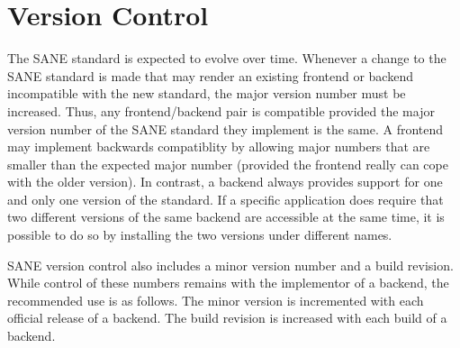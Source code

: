 \documentclass[11pt,DVIps]{report}
\begin{document}
\section{Version Control}

The SANE standard is expected to evolve over time.  Whenever a change
to the SANE standard is made that may render an existing frontend or
backend incompatible with the new standard, the major version number
must be increased.  Thus, any frontend/backend pair is compatible
provided the major version number of the SANE standard they implement
is the same.  A frontend may implement backwards compatiblity by
allowing major numbers that are smaller than the expected major number
(provided the frontend really can cope with the older version).  In
contrast, a backend always provides support for one and only one
version of the standard.  If a specific application does require that
two different versions of the same backend are accessible at the same
time, it is possible to do so by installing the two versions under
different names.

SANE version control also includes a minor version number and a build
revision.  While control of these numbers remains with the implementor
of a backend, the recommended use is as follows.  The minor version is
incremented with each official release of a backend.  The build
revision is increased with each build of a backend.
\end{document}

